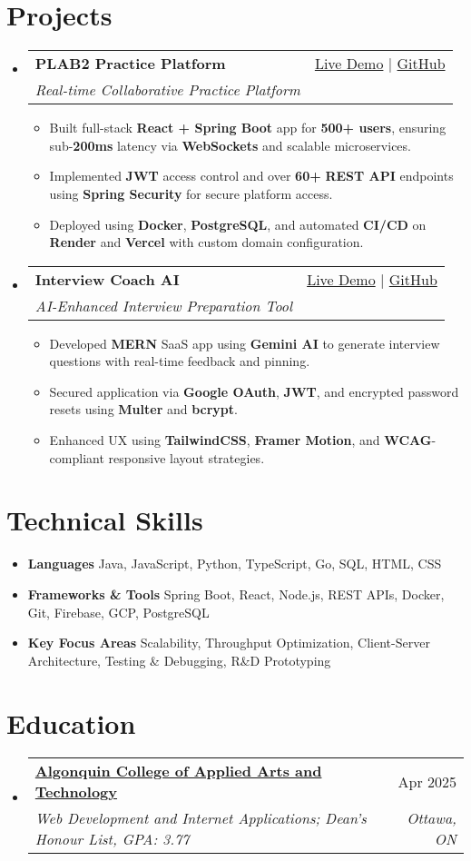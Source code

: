 \documentclass[letterpaper,11pt]{article}
\makeatletter
\newcommand{\resumeItem}[1]{\item\small{#1 \vspace{-2pt}}}
\newcommand{\resumeSubheading}[4]{
  \vspace{-1pt}\item
    \begin{tabular*}{0.97\textwidth}[t]{l@{\extracolsep{\fill}}r}
      \textbf{#1} & #2 \\
      \textit{\small#3} & \textit{\small #4} \\
    \end{tabular*}\vspace{-5pt}
}
\newcommand{\resumeSubHeadingListStart}{\begin{itemize}[leftmargin=*]}
\newcommand{\resumeSubHeadingListEnd}{\end{itemize}}
\newcommand{\resumeItemListStart}{\begin{itemize}}
\newcommand{\resumeItemListEnd}{\end{itemize}\vspace{-5pt}}
\makeatother
\begin{document}
\section{Projects}
  \resumeSubHeadingListStart
    \resumeSubheading
      {\textbf{PLAB2 Practice Platform}}{\href{https://plab2practice.com}{Live Demo} | \href{https://github.com/altansaid/plab2projectnew}{GitHub}}
      {Real-time Collaborative Practice Platform}{}
      \resumeItemListStart
        \resumeItem{Built full-stack \textbf{React + Spring Boot} app for \textbf{500+ users}, ensuring sub-\textbf{200ms} latency via \textbf{WebSockets} and scalable microservices.}
        \resumeItem{Implemented \textbf{JWT} access control and over \textbf{60+} \textbf{REST API} endpoints using \textbf{Spring Security} for secure platform access.}
        \resumeItem{Deployed using \textbf{Docker}, \textbf{PostgreSQL}, and automated \textbf{CI/CD} on \textbf{Render} and \textbf{Vercel} with custom domain configuration.}
      \resumeItemListEnd

    \resumeSubheading
      {\textbf{Interview Coach AI}}{\href{https://interviewcoach-ai.vercel.app/}{Live Demo} | \href{https://github.com/altansaid/interviewcoach-ai}{GitHub}}
      {AI-Enhanced Interview Preparation Tool}{}
      \resumeItemListStart
        \resumeItem{Developed \textbf{MERN} SaaS app using \textbf{Gemini AI} to generate interview questions with real-time feedback and pinning.}
        \resumeItem{Secured application via \textbf{Google OAuth}, \textbf{JWT}, and encrypted password resets using \textbf{Multer} and \textbf{bcrypt}.}
        \resumeItem{Enhanced UX using \textbf{TailwindCSS}, \textbf{Framer Motion}, and \textbf{WCAG}-compliant responsive layout strategies.}
      \resumeItemListEnd
  \resumeSubHeadingListEnd

\section{Technical Skills}
  \resumeItemListStart
    \resumeItem{\textbf{Languages}}{Java, JavaScript, Python, TypeScript, Go, SQL, HTML, CSS}
    \resumeItem{\textbf{Frameworks \& Tools}}{Spring Boot, React, Node.js, REST APIs, Docker, Git, Firebase, GCP, PostgreSQL}
    \resumeItem{\textbf{Key Focus Areas}}{Scalability, Throughput Optimization, Client-Server Architecture, Testing \& Debugging, R\&D Prototyping}
  \resumeItemListEnd

\section{Education}
  \resumeSubHeadingListStart
    \resumeSubheading
      {\href{https://www.algonquincollege.com/sat/program/web-development-internet-applications/}{Algonquin College of Applied Arts and Technology}}{Apr 2025}
      {Web Development and Internet Applications; Dean's Honour List, GPA: 3.77}{Ottawa, ON}
  \resumeSubHeadingListEnd
\end{document}
